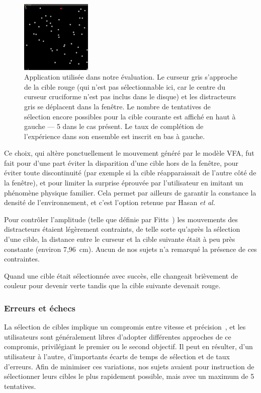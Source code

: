 	\begin{figure}
		\centering
		\includegraphics[width=0.3\textwidth]{figures/ch4/app}
		\caption[Application utilisée dans notre évaluation]{Application utilisée dans notre évaluation. Le curseur gris s'approche de la cible rouge (qui n'est pas sélectionnable ici, car le centre du curseur cruciforme n'est pas inclus dans le disque) et les distracteurs gris se déplacent dans la fenêtre. Le nombre de tentatives de sélection encore possibles pour la cible courante est affiché en haut à gauche --- 5 dans le cas présent. Le taux de complétion de l'expérience dans son ensemble est inscrit en bas à gauche.}
		\label{fig:app}
	\end{figure}
	
	Ce choix, qui altère ponctuellement le mouvement généré par le modèle VFA, fut fait pour d'une part éviter la disparition d'une cible hors de la fenêtre, pour éviter toute discontinuité (par exemple si la cible réapparaissait de l'autre côté de la fenêtre), et pour limiter la \og surprise \fg{} éprouvée par l'utilisateur en imitant un phénomène physique familier. Cela permet par ailleurs de garantir la constance la densité de l'environnement, et c'est l'option retenue par Hasan \emph{et al.}~\cite{hasan2011comet}
	
	Pour contrôler l'amplitude (telle que définie par Fitts~\cite{fitts1954information}) les mouvements des distracteurs étaient légèrement contraints, de telle sorte qu'après la sélection d'une cible, la distance entre le curseur et la cible suivante était à peu près constante (environ 7,96~cm). Aucun de nos sujets n'a remarqué la présence de ces contraintes.
	
	Quand une cible était sélectionnée avec succès, elle changeait brièvement de couleur pour devenir verte tandis que la cible suivante devenait rouge.
	
	\subsubsection{Erreurs et échecs}
	La sélection de cibles implique un compromis entre vitesse et précision~\cite{guiard2011fitt}, et les utilisateurs sont généralement libres d'adopter différentes approches de ce compromis, privilégiant le premier ou le second objectif. Il peut en résulter, d'un utilisateur à l'autre, d'importants écarts de temps de sélection et de taux d'erreurs. Afin de minimiser ces variations, nos sujets avaient pour instruction de sélectionner leurs cibles le plus rapidement possible, mais avec un maximum de 5 tentatives.
	
